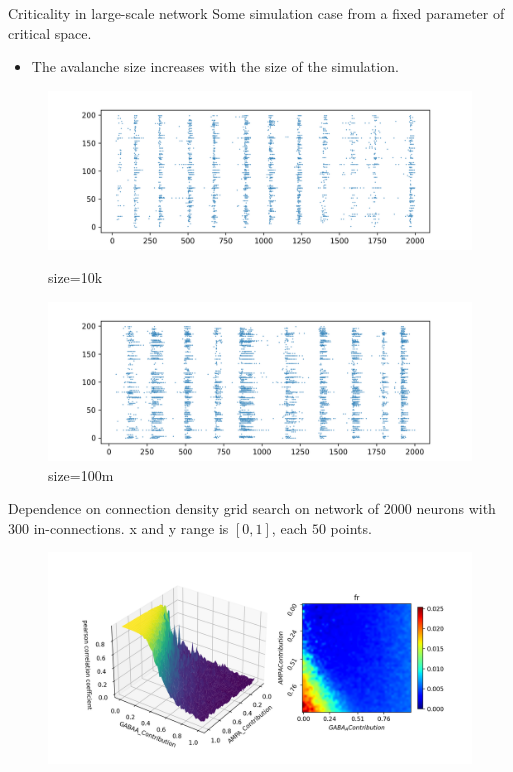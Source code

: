 \documentclass{beamer}
\begin{document}
\begin{frame}{Criticality in large-scale network}
	Some simulation case from a fixed parameter of critical space.
	\begin{itemize}
		\item The avalanche size increases with the size of the simulation.
	\end{itemize}
	\begin{figure}[htbp]
		\centering
		\begin{minipage}{0.49\linewidth}
			\centering
			\includegraphics[width=0.9\linewidth]{fig/from_critical_size_10k}
			\caption{size=10k}
			\label{small_block}
		\end{minipage}
		\begin{minipage}{0.49\linewidth}
			\centering
			\includegraphics[width=0.9\linewidth]{fig/from_critical_size_100m}
			\caption{size=100m}
			\label{big_block}
		\end{minipage}
	\end{figure}
\end{frame}

\begin{frame}{Dependence on connection density}
	grid search on network of 2000 neurons with 300 in-connections. x and y range is $ [0, 1] $, each $ 50 $ points.
	\begin{figure}[htbp]
		\centering
		\includegraphics[width=0.85\linewidth]{fig/degree_300}
	\end{figure}
\end{frame}
\end{document}
